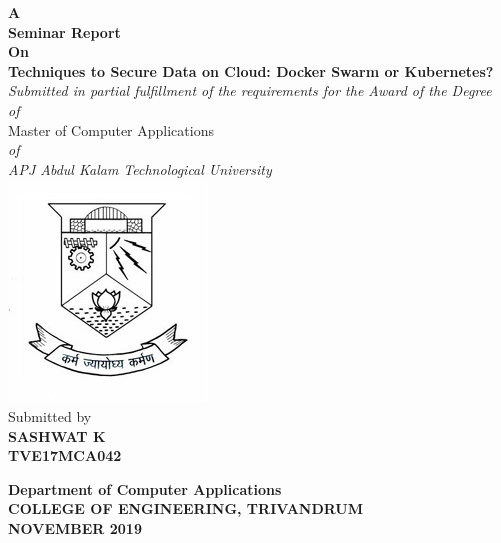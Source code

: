 \begin{titlepage}
\begin{center}
\textbf{ A  }\\
\vspace{0.35cm}
\textbf{ Seminar Report}\\
\vspace{0.35cm}
\textbf{ On  }\\
\vspace{0.55cm}
\textbf{\Large{Techniques to Secure Data on Cloud: Docker Swarm or Kubernetes?}}\\ \vspace{0.5 cm}
\normalsize
\vspace{0.5cm}
\emph{Submitted in partial fulfillment of the requirements for the Award of the Degree}\\
\vspace{0.35cm}
\emph{of}\\
\vspace{0.35cm}
Master of Computer Applications\\
\vspace{0.35cm}
\emph{of}\\
\vspace{0.35cm}
\emph{ {APJ Abdul Kalam Technological University} }\\
\normalsize
\vspace{0.5cm}
\includegraphics[height=0.30\textwidth]{1-title/images/cet.jpg}\\
\vspace{0.3cm}
Submitted by\\
\vspace{0.3cm}
\textbf{SASHWAT K}\\
\vspace{0.5cm}
\textbf{TVE17MCA042 }\\
\vspace{1.0cm}

\normalsize
\textbf{Department of Computer Applications}\\[0.3cm]
\textbf{COLLEGE OF ENGINEERING, TRIVANDRUM}\\[0.4cm]
\textbf{NOVEMBER 2019}\\
\end{center}
\end{titlepage}

